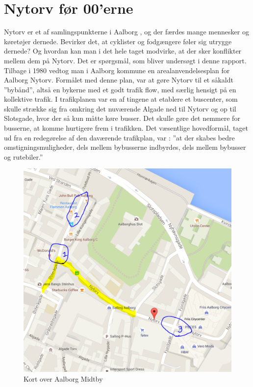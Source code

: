 \section{Nytorv før 00'erne}
\label{sec:nytorv_foer_null}
Nytorv er et af samlingspunkterne i Aalborg , og der færdes mange mennesker og køretøjer dernede. Bevirker det, at cyklister og fodgængere føler sig utrygge dernede? Og hvordan kan man i det hele taget modvirke, at der sker konflikter mellem dem på Nytorv. Det er spørgsmål, som bliver undersøgt i denne rapport.
Tilbage i 1980 vedtog man i Aalborg kommune en arealanvendelsesplan for Aalborg Nytorv. \autocite{Madsen2010}
Formålet med denne plan, var at gøre Nytorv til et såkaldt ”bybånd”, altså en bykerne med et godt trafik flow, med særlig hensigt på en kollektive trafik. I trafikplanen var en af tingene at etablere et buscenter, som skulle strække sig fra omkring det nuværende Algade ned til Nytorv og op til Slotsgade, hvor der så kun måtte køre busser. Det skulle gøre det nemmere for busserne, at komme hurtigere frem i trafikken. Det  væsentlige hovedformål, taget ud fra en redegørelse af den daværende trafikplan, var :
”at der skabes bedre omstigningsmuligheder, dels mellem bybusserne     indbyrdes, dels mellem bybusser og rutebiler.”
\begin{figure}
\centering
\includegraphics[scale=0.5]{figures/Billederogfigur/opserveringspunkter2.PNG}
\caption{Kort over Aalborg Midtby}
\end{figure}
